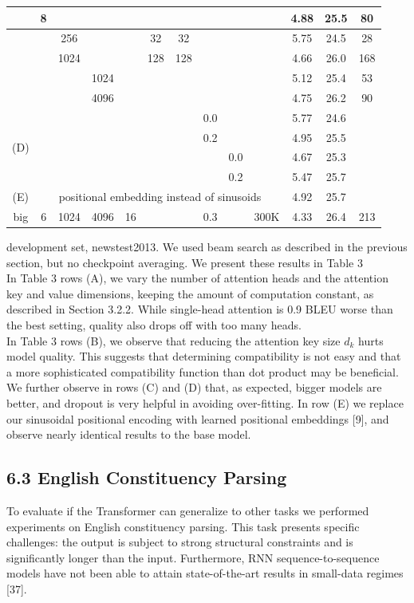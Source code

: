 \documentclass[10pt]{article}
\begin{document}
\begin{center}
\begin{tabular}{|c|c|c|c|c|c|c|c|c|c|c|c|c|}
\hline
 & 8 &  &  &  &  &  &  &  &  & 4.88 & 25.5 & 80 \\
\hline
 &  & 256 &  &  & 32 & 32 &  &  &  & 5.75 & 24.5 & 28 \\
\hline
 &  & 1024 &  &  & 128 & 128 &  &  &  & 4.66 & 26.0 & 168 \\
\hline
 &  &  & 1024 &  &  &  &  &  &  & 5.12 & 25.4 & 53 \\
\hline
 &  &  & 4096 &  &  &  &  &  &  & 4.75 & 26.2 & 90 \\
\hline
\multirow{4}{*}{(D)} &  &  &  &  &  &  & 0.0 &  &  & 5.77 & 24.6 &  \\
\hline
 &  &  &  &  &  &  & 0.2 &  &  & 4.95 & 25.5 &  \\
\hline
 &  &  &  &  &  &  &  & 0.0 &  & 4.67 & 25.3 &  \\
\hline
 &  &  &  &  &  &  &  & 0.2 &  & 5.47 & 25.7 &  \\
\hline
(E) & \multicolumn{9}{|c|}{positional embedding instead of sinusoids} & 4.92 & 25.7 &  \\
\hline
big & 6 & 1024 & 4096 & 16 &  &  & 0.3 &  & 300K & 4.33 & 26.4 & 213 \\
\hline
\end{tabular}
\end{center}

development set, newstest2013. We used beam search as described in the previous section, but no checkpoint averaging. We present these results in Table 3\\
In Table 3 rows (A), we vary the number of attention heads and the attention key and value dimensions, keeping the amount of computation constant, as described in Section 3.2.2. While single-head attention is 0.9 BLEU worse than the best setting, quality also drops off with too many heads.\\
In Table 3 rows (B), we observe that reducing the attention key size $d_{k}$ hurts model quality. This suggests that determining compatibility is not easy and that a more sophisticated compatibility function than dot product may be beneficial. We further observe in rows (C) and (D) that, as expected, bigger models are better, and dropout is very helpful in avoiding over-fitting. In row (E) we replace our sinusoidal positional encoding with learned positional embeddings [9], and observe nearly identical results to the base model.

\subsection*{6.3 English Constituency Parsing}
To evaluate if the Transformer can generalize to other tasks we performed experiments on English constituency parsing. This task presents specific challenges: the output is subject to strong structural constraints and is significantly longer than the input. Furthermore, RNN sequence-to-sequence models have not been able to attain state-of-the-art results in small-data regimes [37].
\end{document}
